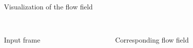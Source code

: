 \begin{frame}{Visualization of the flow field}
\begin{columns}[t]
\begin{column}{.45\textwidth}
\begin{center}
\small{\\Input frame}
\end{center}
\end{column}
\begin{column}{.45\textwidth}
\begin{center}
\small{\\Corresponding flow field}
\end{center}
\end{column}
\end{columns}

\end{frame}

